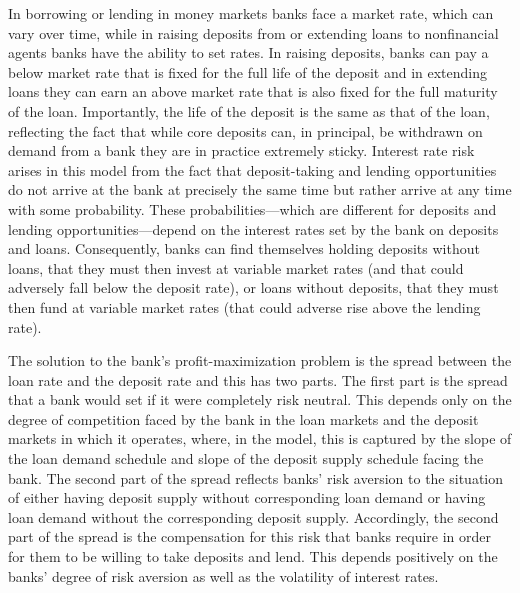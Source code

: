 \documentclass[11pt]{article}
\begin{document}
In borrowing or lending in money markets banks face a market rate, which can vary over time, while in raising deposits from or extending loans to nonfinancial agents banks have the ability to set rates.  In raising deposits, banks can pay a below market rate that is fixed for the full life of the deposit and in extending loans they can earn an above market rate that is also fixed for the full maturity of the loan.  Importantly, the life of the deposit is the same as that of the loan, reflecting the fact that while core deposits can, in principal, be withdrawn on demand from a bank they are in practice extremely sticky.  Interest rate risk arises in this model from the fact that deposit-taking and lending opportunities do not arrive at the bank at precisely the same time but rather arrive at any time with some probability.  These probabilities---which are different for deposits and lending opportunities---depend on the interest rates set by the bank on deposits and loans.  Consequently, banks can find themselves holding deposits without loans, that they must then invest at variable market rates (and that could adversely fall below the deposit rate), or loans without deposits, that they must then fund at variable market rates (that could adverse rise above the lending rate).

The solution to the bank's profit-maximization problem is the spread between the loan rate and the deposit rate and this has two parts. The first part is the spread that a bank would set if it were completely risk neutral. This depends only on the degree of competition faced by the bank in the loan markets and the deposit markets in which it operates, where, in the model, this is captured by the slope of the loan demand schedule and slope of the deposit supply schedule facing the bank. The second part of the spread reflects banks' risk aversion to the situation of either having deposit supply without corresponding loan demand or having loan demand without the corresponding deposit supply. Accordingly, the second part of the spread is the compensation for this risk that banks require in order for them to be willing to take deposits and lend. This depends positively on the banks' degree of risk aversion as well as the volatility of interest rates.
\end{document}
